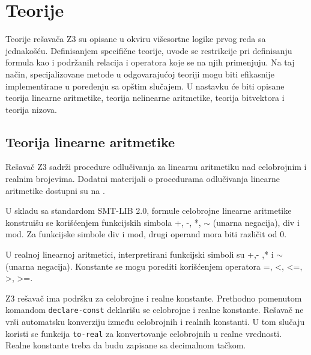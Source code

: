 \documentclass[12pt,oneside]{memoir}
\begin{document}
\section{Teorije} \label{sec:num2}
Teorije rešavača Z3 su opisane u okviru višesortne logike prvog reda sa jednakošću.  Definisanjem specifične teorije, uvode se restrikcije pri definisanju formula kao i podržanih relacija i operatora koje se na njih primenjuju. Na taj način, specijalizovane metode u odgovarajućoj teoriji mogu biti efikasnije implementirane u poređenju sa opštim slučajem. U nastavku će biti opisane teorija linearne aritmetike, teorija nelinearne aritmetike, teorija bitvektora i teorija nizova.

\subsection{Teorija linearne aritmetike} 

Rešavač Z3 sadrži procedure odlučivanja za linearnu aritmetiku nad celobrojnim i realnim brojevima. Dodatni materijali o procedurama odlučivanja linearne aritmetike dostupni su na \cite{FastLinearArithmetic}.
\par

U skladu sa standardom SMT-LIB 2.0, formule celobrojne linearne aritmetike konstruišu se korišćenjem funkcijskih simbola +, -, *, $\sim$ (unarna negacija), div i mod. Za funkcijske simbole div i mod, drugi operand mora biti različit od 0. 

U realnoj linearnoj aritmetici, interpretirani funkcijski simboli su +,- ,* i $\sim$(unarna negacija). Konstante se mogu porediti korišćenjem operatora =, <, <=, >, >=. 
\\
\par
Z3 rešavač ima podršku za celobrojne i realne konstante. Prethodno pomenutom komandom \texttt{declare-const} deklarišu se celobrojne i realne konstante. Rešavač ne vrši automatsku konverziju između celobrojnih i realnih konstanti. U tom slučaju koristi se funkcija \texttt{to-real} za konvertovanje celobrojnih u realne vrednosti.
Realne konstante treba da budu zapisane sa decimalnom tačkom.
\end{document}
